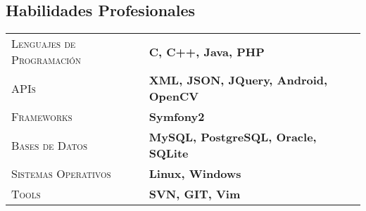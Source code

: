 \documentclass[a4paper, oneside, final]{scrartcl} %
\newcommand{\gray}{\rowcolor[gray]{.90}} %
\begin{document}
\begin{center}



\section{Habilidades Profesionales}

\begin{tabularx}{0.97\linewidth}{>{\raggedleft\scshape}p{5cm}X}
\gray Lenguajes de Programación & \textbf{C, C++, Java, PHP} \\
\gray APIs & \textbf{XML, JSON, JQuery, Android, OpenCV} \\
\gray Frameworks & \textbf{Symfony2} \\
\gray Bases de Datos & \textbf{MySQL, PostgreSQL, Oracle, SQLite} \\
\gray Sistemas Operativos & \textbf{ Linux, Windows }\\ 
\gray Tools & \textbf{SVN, GIT, Vim}
\end{tabularx}


\end{center}
\end{document}
